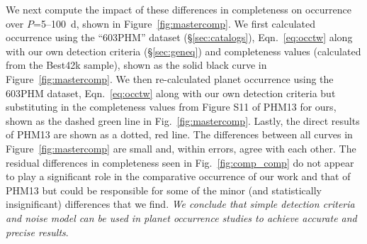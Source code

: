 We next compute the impact of these differences in completeness on
occurrence over $P$=5--100~d, shown in Figure~\ref{fig:mastercomp}. We first 
calculated occurrence using the ``603PHM'' dataset (\S\ref{sec:catalogs}),
Eqn.~\ref{eq:occtw} along with our own detection criteria (\S \ref{sec:geneq}) and completeness
values (calculated from the Best42k sample), shown as the solid black curve in
Figure~\ref{fig:mastercomp}. We then re-calculated planet occurrence
using the 603PHM dataset, Eqn.~\ref{eq:occtw} along with our own detection criteria
but substituting in the completeness values from Figure S11 of PHM13 for
ours, shown as the dashed green line in Fig.~\ref{fig:mastercomp}. Lastly,
the direct results of PHM13 are shown as a dotted, red line. 
The differences between all curves in
Figure~\ref{fig:mastercomp} are small and, within errors, agree with
each other. The residual differences in completeness
seen in Fig.~\ref{fig:comp_comp} do not appear to play a significant role in the
comparative occurrence of our work and that of PHM13 but could be
responsible for some of the minor (and statistically insignificant)
differences that we find. {\it We conclude that simple detection
criteria and noise model can be used in planet occurrence studies to achieve
accurate and precise results}.


